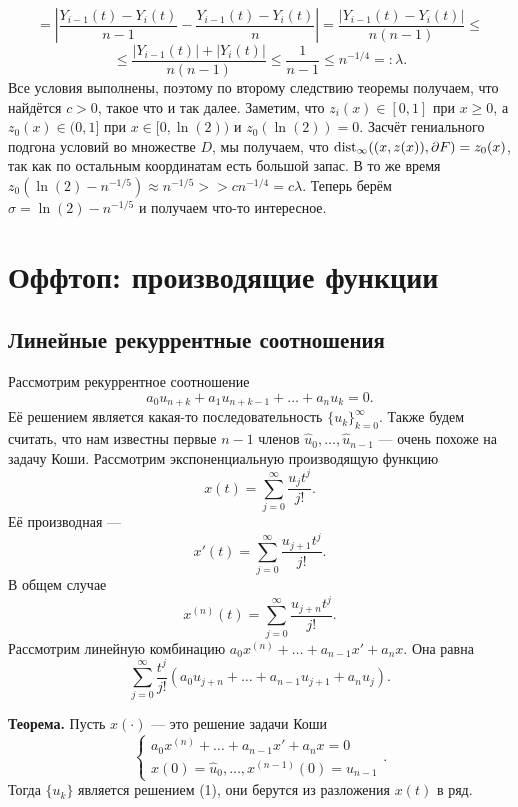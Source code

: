 \[
    = \left| \frac{Y_{i-1}(t) - Y_i(t)}{n - 1} - \frac{Y_{i-1}(t) - Y_i(t)}{n} \right| = \frac{|Y_{i-1}(t) - Y_i(t)|}{n(n-1)} \le
\]
\[
    \le \frac{|Y_{i-1}(t)| + |Y_i(t)|}{n(n - 1)} \le \frac{1}{n-1} \le n^{-1/4} =: \lambda.
\]
Все условия выполнены, поэтому по второму следствию теоремы получаем, что найдётся $c > 0$, такое что и так далее.
Заметим, что $z_i(x) \in [0, 1]$ при $x \ge 0$, а $z_0(x) \in (0, 1]$ при $x \in [0, \ln(2))$ и $z_0(\ln(2)) = 0$.
Засчёт гениального подгона условий во множестве $D$, мы получаем, что $\operatorname{dist}_\infty((x, z(x)), \partial F) = z_0(x)$, так как по остальным координатам есть большой запас.
В то же время $z_0(\ln(2) - n^{-1/5}) \approx n^{-1/5} >> cn^{-1/4} = c\lambda$.
Теперь берём $\sigma = \ln(2) - n^{-1/5}$ и получаем что-то интересное.

\QED

\setcounter{equation}{0}
\section{Оффтоп: производящие функции}
\subsection{Линейные рекуррентные соотношения}
Рассмотрим рекуррентное соотношение
\begin{equation}
    a_0 u_{n+k} + a_1 u_{n+k-1} + \dots + a_n u_k = 0.
\end{equation}
Её решением является какая-то последовательность $\{u_k\}_{k=0}^\infty$.
Также будем считать, что нам известны первые $n - 1$ членов $\widehat u_0, \dots, \widehat u_{n-1}$ --- очень похоже на задачу Коши.
Рассмотрим экспоненциальную производящую функцию
\[
    x(t) = \sum_{j=0}^{\infty} \frac{u_j t^j}{j!}.
\]
Её производная ---
\[
    x'(t) = \sum_{j=0}^{\infty} \frac{u_{j+1} t^j}{j!}.
\]
В общем случае
\[
    x^{(n)}(t) = \sum_{j=0}^{\infty} \frac{u_{j+n} t^j}{j!}.
\]
Рассмотрим линейную комбинацию $a_0 x^{(n)} + \dots + a_{n-1} x' + a_n x$.
Она равна
\[
    \sum_{j=0}^{\infty} \frac{t^j}{j!} (a_0 u_{j+n} + \dots + a_{n-1} u_{j+1} + a_n u_j).
\]

\textbf{Теорема.} Пусть $x(\cdot)$ --- это решение задачи Коши
\[
    \begin{cases}
        a_0 x^{(n)} + \dots + a_{n-1} x' + a_n x = 0 \\
        x(0) = \widehat u_0, \dots, x^{(n-1)}(0) = \widehat u_{n-1}
    \end{cases}.
\]
Тогда $\{u_k\}$ является решением (1), они берутся из разложения $x(t)$ в ряд.

